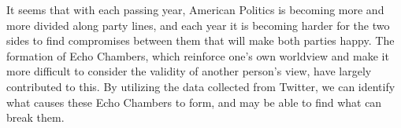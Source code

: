 \documentclass[journal]{IEEEtran}
\begin{document}
It seems that with each passing year, American Politics is becoming more and more divided along party lines, and each year it is becoming harder for the two sides to find compromises between them that will make both parties happy. The formation of Echo Chambers, which reinforce one’s own worldview and make it more difficult to consider the validity of another person’s view, have largely contributed to this. By utilizing the data collected from Twitter, we can identify what causes these Echo Chambers to form, and may be able to find what can break them.

% 
% 
\end{document}
